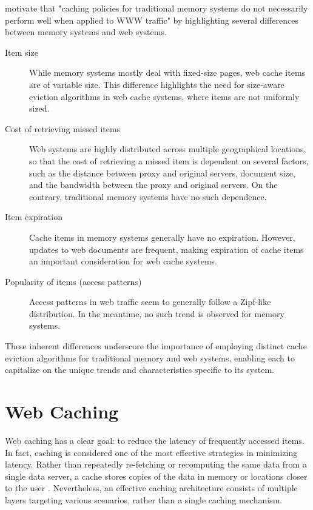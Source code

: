 \citeauthor{web-cache-overview} \cite{web-cache-overview} motivate that "caching policies for traditional memory systems do not necessarily perform well when applied to WWW traffic" by highlighting several differences between memory systems and web systems.

\begin{description}
    \item[Item size] While memory systems mostly deal with fixed-size pages, web cache items are of variable size. This difference highlights the need for size-aware eviction algorithms in web cache systems, where items are not uniformly sized.
    \item[Cost of retrieving missed items] Web systems are highly distributed across multiple geographical locations, so that the cost of retrieving a missed item is dependent on several factors, such as the distance between proxy and original servers, document size, and the bandwidth between the proxy and original servers. On the contrary, traditional memory systems have no such dependence.
    \item[Item expiration] Cache items in memory systems generally have no expiration. However, updates to web documents are frequent, making expiration of cache items an important consideration for web cache systems.
    \item[Popularity of items (access patterns)] Access patterns in web traffic seem to generally follow a Zipf-like distribution. In the meantime, no such trend is observed for memory systems.
\end{description}

These inherent differences underscore the importance of employing distinct cache eviction algorithms for traditional memory and web systems, enabling each to capitalize on the unique trends and characteristics specific to its system.

\section{Web Caching}


Web caching has a clear goal: to reduce the latency of frequently accessed items. In fact, caching is considered one of the most effective strategies in minimizing latency. Rather than repeatedly re-fetching or recomputing the same data from a single data server, a cache stores copies of the data in memory or locations closer to the user \cite{latency-caching, web-cache-performance}. Nevertheless, an effective caching architecture consists of multiple layers targeting various scenarios, rather than a single caching mechanism.

